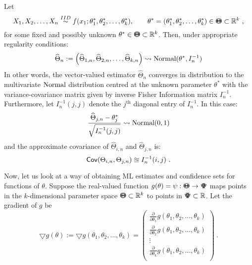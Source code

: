 \begin{prop}
Let 
$$X_1,X_2,\ldots,X_n \overset{IID}{\sim} f(x_1;\theta_1^*,\theta_2^*,\ldots,\theta_k^*), \qquad \theta^*=(\theta_1^*,\theta_2^*,\ldots,\theta_k^*)\in {\Theta}\mspace{-11 mu}{\Theta}\subset \mathbb{R}^k \ ,$$
for some fixed and possibly unknown $\theta^* \in {\Theta}\mspace{-11 mu}{\Theta}\subset \mathbb{R}^k$.  Then, under appropriate regularity conditions:
\[
{\widehat{\Theta}_n} := \left( \widehat{\Theta}_{1,n}, \widehat{\Theta}_{2,n}, \ldots, \widehat{\Theta}_{k,n} \right) \rightsquigarrow \mbox{{\rm Normal}}(\theta^*,I_n^{-1})
\]
In other words, the vector-valued estimator $\widehat{\Theta}_n$ converges in distribution to the multivariate $\mbox{{\rm Normal}}$ distribution centred at the unknown parameter $\theta^*$ with the variance-covariance matrix given by inverse Fisher Information matrix $I_n^{-1}$.  Furthermore, let $I_n^{-1}(j,j)$ denote the $j^{\text{th}}$ diagonal entry of $I_n^{-1}$.  In this case:
\[
\frac{\widehat{\Theta}_{j,n} - \theta^*_j}{\sqrt{I_n^{-1}(j,j)}} \rightsquigarrow \mbox{{\rm Normal}}(0,1)
\]
and the approximate covariance of $\widehat{\Theta}_{i,n}$ and $\widehat{\Theta}_{j,n}$ is:
\[
{\sf Cov}({\Theta}_{i,n},{\Theta}_{j,n}) \approxeq I_n^{-1}(i,j) \ .
\]
\end{prop}
Now, let us look at a way of obtaining ML estimates and confidence sets for functions of $\theta$.  Suppose the real-valued function $g(\theta)=\psi:{\Theta}\mspace{-11 mu}{\Theta} \to {\Psi}\mspace{-11 mu}{\Psi}$ maps points in the $k$-dimensional parameter space ${\Theta}\mspace{-11 mu}{\Theta} \subset \mathbb{R}^k$ to points in ${\Psi}\mspace{-11 mu}{\Psi} \subset \mathbb{R}$.  Let the gradient of $g$ be
\[
\bigtriangledown g(\theta)
:=
\bigtriangledown g (\theta_1,\theta_2,\ldots,\theta_k)
=
\begin{pmatrix}
\frac{\partial} {\partial \theta_1}{g(\theta_1,\theta_2,\ldots,\theta_k)} \\
\frac{\partial} {\partial \theta_2}{g(\theta_1,\theta_2,\ldots,\theta_k)} \\
\vdots \\
\frac{\partial} {\partial \theta_k}{g(\theta_1,\theta_2,\ldots,\theta_k)} \\
\end{pmatrix} \ .
\]
